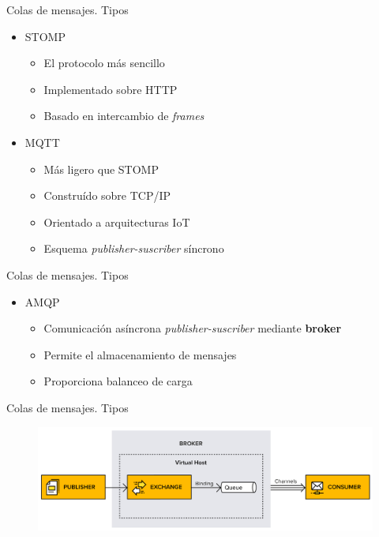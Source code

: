 \documentclass{beamer}
\begin{document}
  \begin{frame}{Colas de mensajes. Tipos}
    \begin{itemize}
      \item STOMP
      \begin{itemize}
        \item El protocolo más sencillo
        \item Implementado sobre HTTP
        \item Basado en intercambio de \textit{frames}
      \end{itemize}
      \item MQTT
      \begin{itemize}
        \item Más ligero que STOMP
        \item Construído sobre TCP/IP
        \item Orientado a arquitecturas IoT
        \item Esquema \textit{publisher-suscriber} síncrono
      \end{itemize}
    \end{itemize}
  \end{frame}

  \begin{frame}{Colas de mensajes. Tipos}
    \begin{itemize}
      \item AMQP
      \begin{itemize}
        \item Comunicación asíncrona \textit{publisher-suscriber} mediante \textbf{broker}
        \item Permite el almacenamiento de mensajes
        \item Proporciona balanceo de carga
      \end{itemize}
    \end{itemize}
  \end{frame}

  \begin{frame}[plain]{Colas de mensajes. Tipos}
    \begin{figure}
      \includegraphics[width=\textwidth]{amq_concepts.png}
    \end{figure}
  \end{frame}
\end{document}
